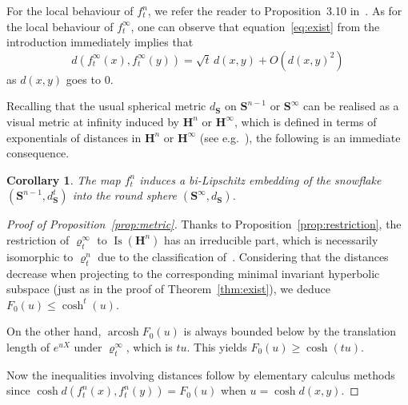 \documentclass[11pt]{article}
\newtheorem{coro}[theo]{Corollary}
\theoremstyle{definition}
\numberwithin{equation}{section}
\numberwithin{figure}{section}
\numberwithin{table}{section}
\DeclareMathOperator{\arcosh}{arcosh}
\newcommand{\bS}{\mathbf{S}}
\newcommand{\HH}{\mathbf{H}}
\newcommand{\HHI}{\mathbf{H}^{\infty}}
\DeclareMathOperator{\Isom}{Is}
\newcommand{\ro}{\varrho}
\begin{document}
For the local behaviour of $f^n_t$, we refer the reader to Proposition~3.10 in~\cite{Monod-Py}. As for the local behaviour of $f^\infty_t$, one can observe that equation~\eqref{eq:exist} from the introduction immediately implies that
\begin{equation*}
d(f^\infty_t(x),f^\infty_t(y))=\sqrt{t}\,d(x,y)+O\left(d(x,y)^2\right)
\end{equation*}
as $d(x,y)$ goes to $0$.

Recalling that the usual spherical metric $d_{\bS}$ on $\bS^{n-1}$ or $\bS^\infty$ can be realised as a visual metric at infinity induced by $\HH^n$ or $\HHI$, which is defined in terms of exponentials of distances in $\HH^n$ or $\HHI$ (see e.g.~\cite[p.~434]{Bridson-Haefliger}), the following is an immediate consequence.

\begin{coro}
The map $f^n_t$ induces a bi-Lipschitz embedding of the snow\-flake $(\bS^{n-1}, d_{\bS}^t)$ into the round sphere $(\bS^\infty, d_{\bS})$.
\end{coro}

\begin{proof}[Proof of Proposition~\ref{prop:metric}]
Thanks to Proposition~\ref{prop:restriction}, the restriction of $\ro^\infty_t$ to $\Isom(\HH^n)$ has an irreducible part, which is necessarily isomorphic to $\ro^n_t$ due to the classification of~\cite{Monod-Py}. Considering that the distances decrease when projecting to the corresponding minimal invariant hyperbolic subspace (just as in the proof of Theorem~\ref{thm:exist}), we deduce $F_0(u) \leq \cosh^t(u)$.

On the other hand, $\arcosh F_0(u)$ is always bounded below by the translation length of $e^{u X}$ under $\ro^\infty_t$, which is $t u$. This yields $F_0(u) \geq \cosh(t u)$.

Now the inequalities involving distances follow by elementary calculus methods since $\cosh d\left(f^n_t(x), f^n_t(y)\right) =F_0(u)$ when $u=\cosh d(x,y)$.
\end{proof}
\end{document}
